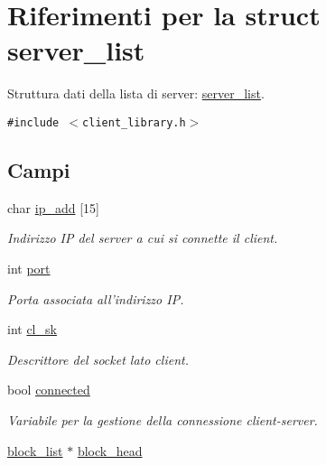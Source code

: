 \hypertarget{structserver__list}{
\section{Riferimenti per la struct server\_\-list}
\label{structserver__list}
}
Struttura dati della lista di server: \hyperlink{structserver__list}{server\_\-list}.  


{\tt \#include $<$client\_\-library.h$>$}

\subsection*{Campi}
\begin{CompactItemize}
\item 
char \hyperlink{structserver__list_ecade329fa4773018ee94fa73ee43d8e_ecade329fa4773018ee94fa73ee43d8e}{ip\_\-add} \mbox{[}15\mbox{]}
\begin{CompactList}\small\item\em Indirizzo IP del server a cui si connette il client. \item\end{CompactList}\item 
int \hyperlink{structserver__list_bb30850b4352cd990f913320d7e243b4_bb30850b4352cd990f913320d7e243b4}{port}
\begin{CompactList}\small\item\em Porta associata all'indirizzo IP. \item\end{CompactList}\item 
int \hyperlink{structserver__list_79719d4ab0eee7769ccba74394c8c09b_79719d4ab0eee7769ccba74394c8c09b}{cl\_\-sk}
\begin{CompactList}\small\item\em Descrittore del socket lato client. \item\end{CompactList}\item 
bool \hyperlink{structserver__list_4c9b2c2aaceed434fdb463dabfe487f4_4c9b2c2aaceed434fdb463dabfe487f4}{connected}
\begin{CompactList}\small\item\em Variabile per la gestione della connessione client-server. \item\end{CompactList}\item 
\hyperlink{structblock__list}{block\_\-list} $\ast$ \hyperlink{structserver__list_7cef5477a059bde2cd16d5da85bdf62b_7cef5477a059bde2cd16d5da85bdf62b}{block\_\-head}

\end{CompactItemize}
